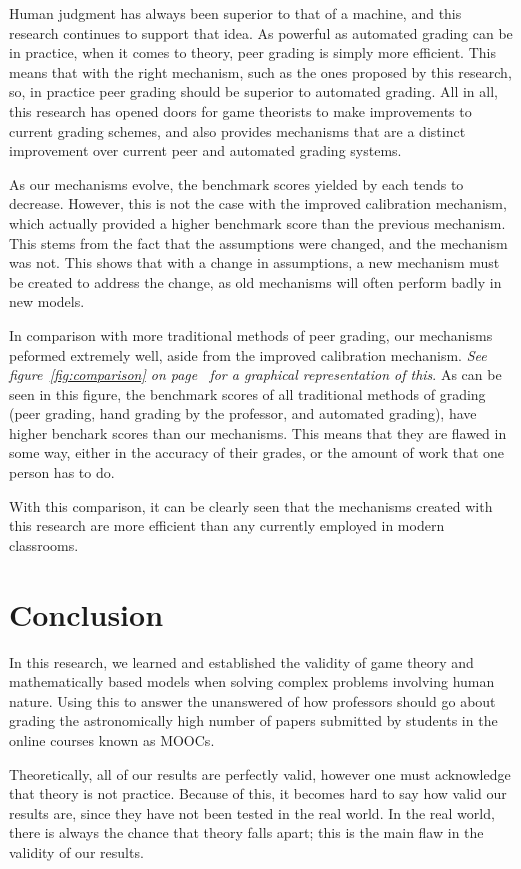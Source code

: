 \documentclass[12pt, Arial]{article}
\begin{document}
Human judgment has always been superior to that of a machine, and this research continues to support that idea. As powerful as automated grading can be in practice, when it comes to theory, peer grading is simply more efficient. This means that with the right mechanism, such as the ones proposed by this research, so, in practice peer grading should be superior to automated grading. All in all, this research has opened doors for game theorists to make improvements to current grading schemes, and also provides mechanisms that are a distinct improvement over current peer and automated grading systems.

As our mechanisms evolve, the benchmark scores yielded by each tends to decrease. However, this is not the case with the improved calibration mechanism, which actually provided a higher benchmark score than the previous mechanism. This stems from the fact that the assumptions were changed, and the mechanism was not. This shows that with a change in assumptions, a new mechanism must be created to address the change, as old mechanisms will often perform badly in new models.

In comparison with more traditional methods of peer grading, our mechanisms peformed extremely well, aside from the improved calibration mechanism. \emph{See figure~\ref{fig:comparison} on page~\pageref{fig:comparison} for a graphical representation of this}. As can be seen in this figure, the benchmark scores of all traditional methods of grading (peer grading, hand grading by the professor, and automated grading), have higher benchark scores than our mechanisms. This means that they are flawed in some way, either in the accuracy of their grades, or the amount of work that one person has to do.

With this comparison, it can be clearly seen that the mechanisms created with this research are more efficient than any currently employed in modern classrooms.

\section{Conclusion}
In this research, we learned and established the validity of game theory and mathematically based models when solving complex problems involving human nature. Using this to answer the unanswered of how professors should go about grading the astronomically high number of papers submitted by students in the online courses known as MOOCs.

Theoretically, all of our results are perfectly valid, however one must acknowledge that theory is not practice. Because of this, it becomes hard to say how valid our results are, since they have not been tested in the real world. In the real world, there is always the chance that theory falls apart; this is the main flaw in the validity of our results.
\end{document}
